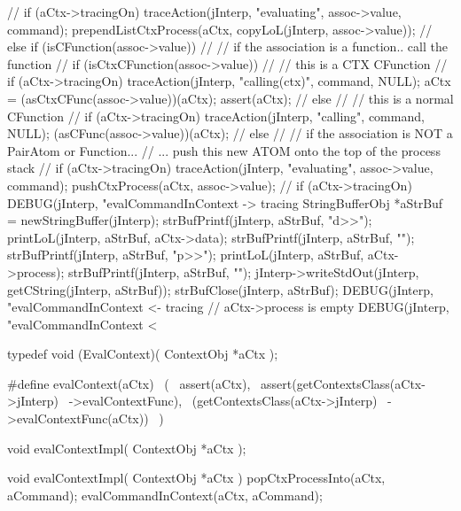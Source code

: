 {{{{        //
        if (aCtx->tracingOn)
          traceAction(jInterp, "evaluating", assoc->value, command);
        prependListCtxProcess(aCtx,
          copyLoL(jInterp, assoc->value));
        //
      } else if (isCFunction(assoc->value)) {
        //
        // if the association is a function.. call the function
        //
        if (isCtxCFunction(assoc->value)) {
          //
          // this is a CTX CFunction
          //
          if (aCtx->tracingOn) 
            traceAction(jInterp, "calling(ctx)", command, NULL);
          aCtx = (asCtxCFunc(assoc->value))(aCtx);
          assert(aCtx);
          //
        } else {
          //
          // this is a normal CFunction
          //
          if (aCtx->tracingOn)
            traceAction(jInterp, "calling", command, NULL);
          (asCFunc(assoc->value))(aCtx);
          //
        }
      } else {
        //
        // if the association is NOT a PairAtom or Function...
        // ... push this new ATOM onto the top of the process stack
        //
        if (aCtx->tracingOn)
          traceAction(jInterp, "evaluating", assoc->value, command);
        pushCtxProcess(aCtx, assoc->value);
        //
      }
    }
    if (aCtx->tracingOn) {
      DEBUG(jInterp, "evalCommandInContext -> tracing%
      StringBufferObj *aStrBuf = newStringBuffer(jInterp);
      strBufPrintf(jInterp, aStrBuf, "d>>");
      printLoL(jInterp, aStrBuf, aCtx->data);
      strBufPrintf(jInterp, aStrBuf, "\n");
      strBufPrintf(jInterp, aStrBuf, "p>>");
      printLoL(jInterp, aStrBuf, aCtx->process);
      strBufPrintf(jInterp, aStrBuf, "\n");
      jInterp->writeStdOut(jInterp, getCString(jInterp, aStrBuf));
      strBufClose(jInterp, aStrBuf);
      DEBUG(jInterp, "evalCommandInContext <- tracing%
    }
  } // aCtx->process is empty
  DEBUG(jInterp, "evalCommandInContext < %
}
\stopCCode

\startCHeader
typedef void (EvalContext)(
  ContextObj *aCtx
);

#define evalContext(aCtx)                   \
  (                                         \
    assert(aCtx),                           \
    assert(getContextsClass(aCtx->jInterp)  \
      ->evalContextFunc),                   \
    (getContextsClass(aCtx->jInterp)        \
      ->evalContextFunc(aCtx))              \
  )
\stopCHeader

\setCHeaderStream{private}
\startCHeader
void evalContextImpl(
  ContextObj *aCtx
);
\stopCHeader
{}

\startCCode
void evalContextImpl(
  ContextObj *aCtx
) {
  popCtxProcessInto(aCtx, aCommand);
  evalCommandInContext(aCtx, aCommand);
}
\stopCCode

